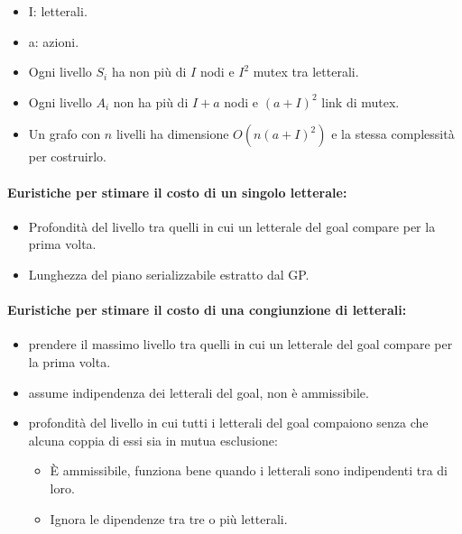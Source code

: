 
\begin{itemize}
  \item I: letterali. 
  \item a: azioni. 
  \item Ogni livello $S_i$ ha non più di $I$ nodi e $I^2$ mutex tra letterali. 
  \item Ogni livello $A_i$ non ha più di $I + a$ nodi e $(a + I)^2$ link di mutex. 
  \item Un grafo con $n$ livelli ha dimensione $O(n(a + I)^2)$ e la stessa complessità per costruirlo. 
\end{itemize}


\paragraph{Euristiche per stimare il costo di un singolo letterale:}

\begin{itemize}
  \item Profondità del livello tra quelli in cui un letterale del goal compare per la prima volta. 
    \item Lunghezza del piano serializzabile estratto dal GP.
\end{itemize}

\paragraph{Euristiche per stimare il costo di una congiunzione di letterali:}

\begin{itemize}
  \item {} prendere il massimo livello tra quelli in cui un letterale del goal compare per la prima volta. 
  \item {} assume indipendenza dei letterali del goal, non è ammissibile. 
  \item {} profondità del livello in cui tutti i letterali del goal compaiono senza che alcuna coppia di essi sia in mutua esclusione: 
    \begin{itemize}
      \item È ammissibile, funziona bene quando i letterali sono indipendenti tra di loro. 
      \item Ignora le dipendenze tra tre o più letterali.
    \end{itemize}
\end{itemize}

